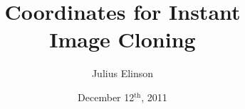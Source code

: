 \documentclass{beamer}
\theoremstyle{remark}
\begin{document}
\title{Coordinates for Instant\\Image Cloning}
\author{Julius Elinson}
\date{December 12$^{\text{th}}$, 2011}
\beamertemplatenavigationsymbolsempty
{}
\begin{frame}
\titlepage

\end{frame}
\begin{comment}
\begin{frame}[t]
 \frametitle{Image Composition}
 \pause
\begin{block}{Using a mask}
\begin{itemize}
 \item Cumbersome
 \item Same size as image
 \item Changes with each patch
\end{itemize}
 \pause
\begin{block}{Poisson cloning}
\begin{itemize}
 \item Automates the masking process
 \item Creates a membrane for patch area
 \item \alert<4>{Difficult and expensive to solve}
\end{itemize}
\visible<4>{\centering\emph{Requires solving a system of partial differential equations}}
\end{block}
\end{block}
\end{frame}

\begin{frame}[t]
 \frametitle{Image Composition}
 \vspace{2mm}
 \emph{Method proposed by Farbman et al. in paper from 2009:} 
 \pause
\begin{block}{Mean-value cloning}
\begin{itemize}
 \item Approximates poisson cloning
 \item Nearly identical results
 \item Applies simple ideas of interpolation and averaging
\end{itemize}
\end{block}
\pause
\begin{block}{Extensions}
\begin{itemize}
 \item Video cloning
 \item Image stitching
 \end{itemize}
 \end{block}

\end{frame}
\end{comment}
\end{document}
